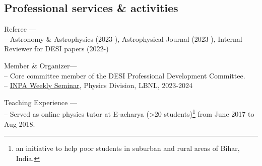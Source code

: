 \documentclass[12pt,letterpaper]{article}
\begin{document}


\vspace{-2mm}
\subsection{Professional services \& activities}

\begin{list}{}{\cvlist}
    \item Referee --- \\
    -- Astronomy \& Astrophysics (2023-), Astrophysical Journal (2023-), Internal Reviewer for DESI papers (2022-)
    \item Member \& Organizer--- \\
        -- Core committee member of the DESI Professional Development Committee. \\
        -- \href{https://inpa.lbl.gov/events/}{INPA Weekly Seminar}, Physics Division, LBNL, 2023-2024 \\
      \item Teaching Experience --- \\
        -- Served as online physics tutor at E-acharya (>20 students)\footnote{an initiative to help poor students in suburban and rural areas of Bihar, India.} from June 2017 to Aug 2018. \\
        \end{list}
  \vspace{-2mm}
\end{document}
